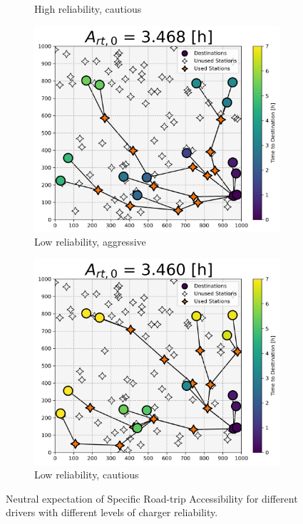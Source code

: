 \documentclass[11pt]{article}
\begin{document}
\begin{multicols}{2}
\begin{figure}[H]
\begin{subfigure}[t]{.5\linewidth}
		\caption{High reliability, cautious}
	\end{subfigure}
	\begin{subfigure}[t]{.5\linewidth}
		\centering\captionsetup{width = .8\linewidth}
		\includegraphics[width = \linewidth]{figs/random_example_low_reliability_aggressive_n.png}
		\caption{Low reliability, aggressive}
	\end{subfigure}%
	\begin{subfigure}[t]{.5\linewidth}
		\centering\captionsetup{width = .8\linewidth}
		\includegraphics[width = \linewidth]{figs/random_example_low_reliability_cautious_n.png}
		\caption{Low reliability, cautious}
	\end{subfigure}
	\caption{Neutral expectation of Specific Road-trip Accessibility for different drivers with different levels of charger reliability.}
	\label{fig:perceived_srta_random_n}
\end{figure}


\end{multicols}
\end{document}
